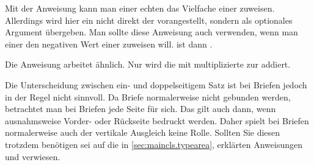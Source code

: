 \begin{Declaration}
\end{Declaration}
Mit der Anweisung
 kann man
einer echten  das Vielfache einer  zuweisen.
Allerdings wird hier ein  nicht direkt der 
vorangestellt, sondern als optionales Argument übergeben. Man sollte diese
Anweisung auch verwenden, wenn man einer  den negativen Wert
einer  zuweisen will. %
\iffalse %
  Als \PName{Faktor} kann dann wahlweise ein Minuszeichen oder \PValue{-1}
  verwendet werden. 
%
\else %
   ist dann .
%
\fi 
%
Die Anweisung 
arbeitet ähnlich. Nur wird die mit  multiplizierte
 zur  addiert.%
%
\EndIndexGroup
%
\EndIndexGroup






Die Unterscheidung zwischen ein- und doppelseitigem Satz ist bei Briefen
jedoch in der Regel nicht sinnvoll. Da Briefe normalerweise nicht gebunden
werden, betrachtet man bei Briefen jede Seite für sich. Das gilt auch dann,
wenn ausnahmsweise Vorder- oder Rückseite bedruckt werden. Daher spielt bei
Briefen normalerweise auch der vertikale Ausgleich keine Rolle. Sollten Sie
diesen trotzdem benötigen
\iffalse%
oder wissen wollen, was das ist, %
\fi%
sei auf die in \autoref{sec:maincls.typearea},
 erklärten Anweisungen
 und
 verwiesen.%
%
\EndIndexGroup


